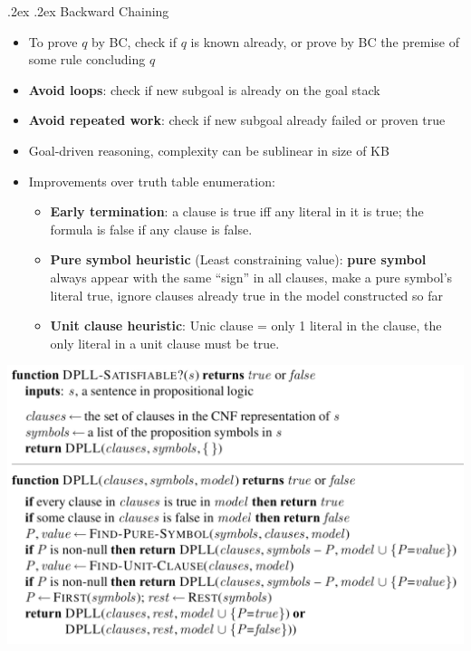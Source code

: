 \documentclass[11pt,landscape,a4paper]{article}
\makeatletter
\renewcommand{\subsubsection}{\@startsection{subsubsection}{1}{0mm}%
  {.2ex}%
  {.2ex}%
{\rmfamily\bfseries}}
\makeatother
\begin{document}
\begin{multicols*}{4}
  \subsubsection{Backward Chaining}
  \begin{itemize}
    \item To prove $q$ by BC, check if $q$ is known already, or prove by BC the premise of some rule concluding $q$
    \item \textbf{Avoid loops}: check if new subgoal is already on the goal stack
    \item \textbf{Avoid repeated work}: check if new subgoal already failed or proven true
    \item Goal-driven reasoning, complexity can be sublinear in size of KB
    \item Improvements over truth table enumeration:
          \begin{itemize}
            \item \textbf{Early termination}: a clause is true iff any literal in it is true; the formula is false if any clause is false.
            \item \textbf{Pure symbol heuristic} (Least constraining value): \textbf{pure symbol} always appear with the same ``sign'' in all clauses, make a pure symbol's literal true, ignore clauses already true in the model constructed so far
            \item \textbf{Unit clause heuristic}: Unic clause = only 1 literal in the clause, the only literal in a unit clause must be true.
          \end{itemize}
  \end{itemize}

  \includegraphics[width=\columnwidth]{dpll}

\end{multicols*}
\end{document}
